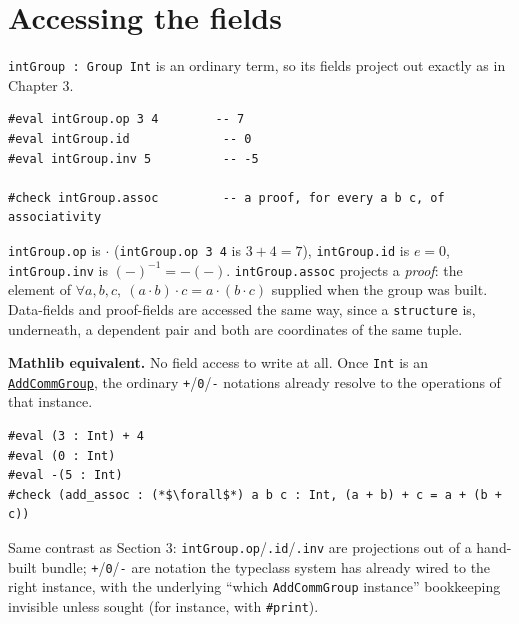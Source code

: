\section{Accessing the fields}\label{sec:07-groups:05-accessing-fields:1}

\texttt{intGroup : Group Int} is an ordinary term, so its fields project out exactly as in Chapter 3.

\begin{lstlisting}
#eval intGroup.op 3 4        -- 7
#eval intGroup.id             -- 0
#eval intGroup.inv 5          -- -5

#check intGroup.assoc         -- a proof, for every a b c, of associativity
\end{lstlisting}

\begin{mathreading}

\texttt{intGroup.op} is \(\cdot\) (\texttt{intGroup.op 3 4} is \(3 + 4 = 7\)), \texttt{intGroup.id} is \(e = 0\), \texttt{intGroup.inv} is \((-)^{-1} =
-(-)\). \texttt{intGroup.assoc} projects a \emph{proof}: the element of \(\forall
a,b,c,\ (a\cdot b)\cdot c = a\cdot(b\cdot c)\) supplied when the group was built. Data-fields and proof-fields are accessed the same way, since a \texttt{structure} is, underneath, a dependent pair and both are coordinates of the same tuple.

\end{mathreading}

\textbf{Mathlib equivalent.} No field access to write at all. Once \texttt{Int} is an \href{https://loogle.lean-lang.org/?q=AddCommGroup}{\texttt{AddCommGroup}}, the ordinary \texttt{+}/\texttt{0}/\texttt{-\allowbreak{}} notations already resolve to the operations of that instance.

\begin{lstlisting}
#eval (3 : Int) + 4
#eval (0 : Int)
#eval -(5 : Int)
#check (add_assoc : (*$\forall$*) a b c : Int, (a + b) + c = a + (b + c))
\end{lstlisting}

Same contrast as Section 3: \texttt{intGroup.op}/\texttt{.id}/\texttt{.inv} are projections out of a hand-built bundle; \texttt{+}/\texttt{0}/\texttt{-\allowbreak{}} are notation the typeclass system has already wired to the right instance, with the underlying ``which \texttt{AddCommGroup} instance'' bookkeeping invisible unless sought (for instance, with \texttt{\#print}).
